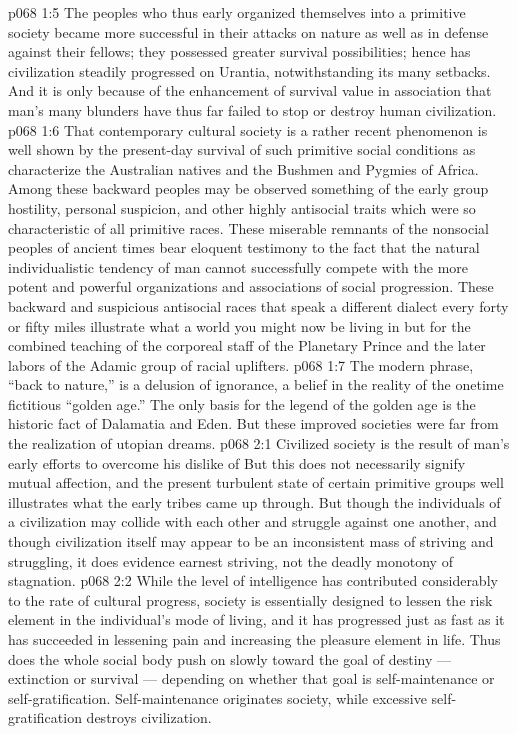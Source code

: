 \vs p068 1:5 The peoples who thus early organized themselves into a primitive society became more successful in their attacks on nature as well as in defense against their fellows; they possessed greater survival possibilities; hence has civilization steadily progressed on Urantia, notwithstanding its many setbacks. And it is only because of the enhancement of survival value in association that man’s many blunders have thus far failed to stop or destroy human civilization.
\vs p068 1:6 \pc That contemporary cultural society is a rather recent phenomenon is well shown by the present\hyp{}day survival of such primitive social conditions as characterize the Australian natives and the Bushmen and Pygmies of Africa. Among these backward peoples may be observed something of the early group hostility, personal suspicion, and other highly antisocial traits which were so characteristic of all primitive races. These miserable remnants of the nonsocial peoples of ancient times bear eloquent testimony to the fact that the natural individualistic tendency of man cannot successfully compete with the more potent and powerful organizations and associations of social progression. These backward and suspicious antisocial races that speak a different dialect every forty or fifty miles illustrate what a world you might now be living in but for the combined teaching of the corporeal staff of the Planetary Prince and the later labors of the Adamic group of racial uplifters.
\vs p068 1:7 The modern phrase, “back to nature,” is a delusion of ignorance, a belief in the reality of the onetime fictitious “golden age.” The only basis for the legend of the golden age is the historic fact of Dalamatia and Eden. But these improved societies were far from the realization of utopian dreams.
\vs p068 2:1 Civilized society is the result of man’s early efforts to overcome his dislike of  But this does not necessarily signify mutual affection, and the present turbulent state of certain primitive groups well illustrates what the early tribes came up through. But though the individuals of a civilization may collide with each other and struggle against one another, and though civilization itself may appear to be an inconsistent mass of striving and struggling, it does evidence earnest striving, not the deadly monotony of stagnation.
\vs p068 2:2 While the level of intelligence has contributed considerably to the rate of cultural progress, society is essentially designed to lessen the risk element in the individual’s mode of living, and it has progressed just as fast as it has succeeded in lessening pain and increasing the pleasure element in life. Thus does the whole social body push on slowly toward the goal of destiny --- extinction or survival --- depending on whether that goal is self\hyp{}maintenance or self\hyp{}gratification. Self\hyp{}maintenance originates society, while excessive self\hyp{}gratification destroys civilization.
